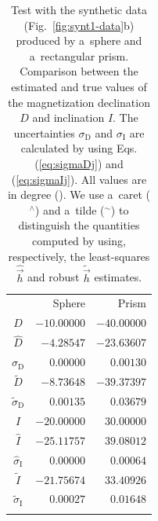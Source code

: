 \documentclass[journal abbreviation, npg]{copernicus}
\begin{document}
\begin{table}[t]
\caption{Test with the synthetic data (Fig.~\ref{fig:synt1-data}b) produced
by a~sphere and a~rectangular prism. Comparison between the estimated and
true values of the magnetization declination $D$ and inclination $I$. The
uncertainties $\sigma_\mathrm{D}$ and $\sigma_\mathrm{I}$ are calculated by
using Eqs. (\ref{eq:sigmaDj}) and (\ref{eq:sigmaIj}). All values are in
degree ({\degree}). We use a~caret ($^{\wedge}$) and a~tilde ($^{\sim}$) to
distinguish the quantities computed by using, respectively, the least-squares
$\hat{\vec{h}}$ and robust $\tilde{\vec{h}}$ estimates.}
\begin{tabular}{crr}
\tophline
&Sphere &Prism \\
\middlehline
$D$ &$-10.00000$ &$-40.00000$ \\
$\hat{D}$ &$-4.28547$ &$-23.63607$ \\
$\hat{\sigma}_\mathrm{D}$ &$0.00000$ &$0.00130$  \\
$\tilde{D}$ &$-8.73648$ &$-39.37397$ \\
$\tilde{\sigma}_\mathrm{D}$ &$0.00135$ &$0.03679$ \\
$I$ &$-20.00000$ &$30.00000$ \\
$\hat{I}$ &$-25.11757$ &$39.08012$  \\
$\hat{\sigma}_\mathrm{I}$ &$0.00000$ &$0.00064$  \\
$\tilde{I}$ &$-21.75674$ &$33.40926$ \\
$\tilde{\sigma}_\mathrm{I}$ &$0.00027$ &$0.01648$ \\
\bottomhline
\end{tabular}
\label{tab:synt1-with-inter-anomaly}
\end{table}
\end{document}
